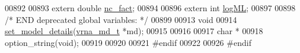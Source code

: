 \begin{DoxyCode}
00892 
00893 \textcolor{keyword}{extern} \textcolor{keywordtype}{double} \hyperlink{group__model__details_abcf568e6124bfcb2f847ff4eb0dfded6}{nc\_fact};
00894 
00896 \textcolor{keyword}{extern} \textcolor{keywordtype}{int}    \hyperlink{group__model__details_ae259f89a94acae0c7f1412603e7f57b5}{logML};
00897 
00898 \textcolor{comment}{/* END deprecated global variables: */}
00899 
00913 \textcolor{keywordtype}{void}
00914 \hyperlink{group__model__details_gabad896c3650d420f3f3ddefc69e2bceb}{set\_model\_details}(\hyperlink{group__model__details_structvrna__md__s}{vrna\_md\_t} *md);
00915 
00916 
00917 \textcolor{keywordtype}{char} *
00918 option\_string(\textcolor{keywordtype}{void});
00919 
00920 
00921 \textcolor{preprocessor}{#endif}
00922 
00926 \textcolor{preprocessor}{#endif}
\end{DoxyCode}
